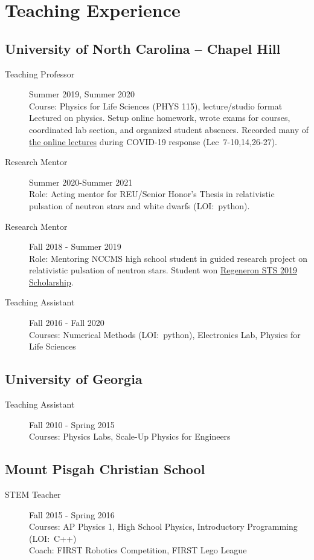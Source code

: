 \documentclass[11pt]{article}
\begin{document}
\section*{Teaching Experience}
\begin{minipage}{\textwidth}
\subsection*{University of North Carolina -- Chapel Hill}
	\begin{description}
		\item[Teaching Professor] Summer 2019, Summer 2020\\
			Course: Physics for Life Sciences (PHYS 115), lecture/studio format\\
			Lectured on physics.  Setup online homework, wrote exams for courses, coordinated lab section, and organized student absences.
			Recorded many of \href{https://www.youtube.com/playlist?list=PLGw8-QpmEugz6IxX75R1kvd9NM_53pQXV}{the online lectures} during COVID-19 response (Lec~7-10,14,26-27).
		\item[Research Mentor] Summer 2020-Summer 2021\\
		Role: Acting mentor for REU/Senior Honor's Thesis in relativistic pulsation of neutron stars and white dwarfs (LOI:~python).
		\item[Research Mentor] Fall 2018 - Summer 2019\\
			Role: Mentoring NCCMS high school student in guided research project on relativistic pulsation of neutron stars.  Student won \href{https://www.societyforscience.org/regeneron-sts/science-talent-search-2019/}{Regeneron STS 2019 Scholarship}.
		\item[Teaching Assistant] Fall 2016 - Fall 2020\\
			Courses: Numerical Methods (LOI:~python), Electronics Lab, Physics for Life Sciences
	\end{description}
	
\subsection*{University of Georgia}
	\begin{description}
		\item[Teaching Assistant] Fall 2010 - Spring 2015\\
			Courses: Physics Labs, Scale-Up Physics for Engineers
	\end{description}

\subsection*{Mount Pisgah Christian School}
	\begin{description}
		\item[STEM Teacher] Fall 2015 - Spring 2016\\
			Courses: AP Physics 1, High School Physics, Introductory Programming (LOI:~C++)\\
			Coach: FIRST Robotics Competition, FIRST Lego League
	\end{description}
\end{minipage}
\end{document}
